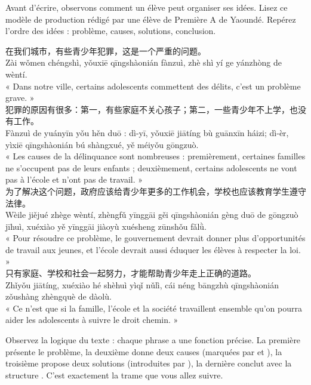 \documentclass[11pt]{article}
\newcommand{\cle}[1]{{\popxbold\color{popdark}#1}}
\newcommand{\zh}[1]{\ifmmode\text{#1}\else{#1}\fi}
\begin{document}
Avant d'écrire, observons comment un élève peut organiser ses idées. Lisez ce modèle de production rédigé par une élève de Première A de Yaoundé. Repérez l'ordre des idées : problème, causes, solutions, conclusion.

\begin{textebox}
在我们城市，有些青少年犯罪，这是一个严重的问题。\\
Zài wǒmen chéngshì, yǒuxiē qīngshàonián fànzuì, zhè shì yí ge yánzhòng de wèntí.\\
« Dans notre ville, certains adolescents commettent des délits, c'est un problème grave. »\\[4pt]
犯罪的原因有很多：第一，有些家庭不关心孩子；第二，一些青少年不上学，也没有工作。\\
Fànzuì de yuányīn yǒu hěn duō : dì-yī, yǒuxiē jiātíng bù guānxīn háizi; dì-èr, yìxiē qīngshàonián bú shàngxué, yě méiyǒu gōngzuò.\\
« Les causes de la délinquance sont nombreuses : premièrement, certaines familles ne s'occupent pas de leurs enfants ; deuxièmement, certains adolescents ne vont pas à l'école et n'ont pas de travail. »\\[4pt]
为了解决这个问题，政府应该给青少年更多的工作机会，学校也应该教育学生遵守法律。\\
Wèile jiějué zhège wèntí, zhèngfǔ yīnggāi gěi qīngshàonián gèng duō de gōngzuò jīhuì, xuéxiào yě yīnggāi jiàoyù xuésheng zūnshǒu fǎlǜ.\\
« Pour résoudre ce problème, le gouvernement devrait donner plus d'opportunités de travail aux jeunes, et l'école devrait aussi éduquer les élèves à respecter la loi. »\\[4pt]
只有家庭、学校和社会一起努力，才能帮助青少年走上正确的道路。\\
Zhǐyǒu jiātíng, xuéxiào hé shèhuì yìqǐ nǔlì, cái néng bāngzhù qīngshàonián zǒushàng zhèngquè de dàolù.\\
« Ce n'est que si la famille, l'école et la société travaillent ensemble qu'on pourra aider les adolescents à suivre le droit chemin. »
\end{textebox}

Observez la logique du texte : chaque phrase a une fonction précise. La première présente le \cle{problème}, la deuxième donne deux \cle{causes} (marquées par \zh{第一} et \zh{第二}), la troisième propose deux \cle{solutions} (introduites par \zh{为了}), la dernière conclut avec la structure \zh{只有……才能……}. C'est exactement la trame que vous allez suivre.
\end{document}
